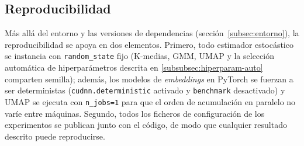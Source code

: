 \subsection{Reproducibilidad}
\label{subsec:reproducibilidad} Más allá del entorno y las versiones de
dependencias (sección~\ref{subsec:entorno}), la reproducibilidad se apoya en
dos elementos. Primero, todo estimador estocástico se instancia con
\texttt{random\_state} fijo (K-medias, GMM, UMAP y la selección automática de
hiperparámetros descrita en \ref{subsubsec:hiperparam-auto} comparten semilla);
además, los modelos de \textit{embeddings} en PyTorch se fuerzan a ser
deterministas (\texttt{cudnn.deterministic} activado y \texttt{benchmark}
desactivado) y UMAP se ejecuta con \texttt{n\_jobs=1} para que el orden de
acumulación en paralelo no varíe entre máquinas. Segundo, todos los ficheros de
configuración de los experimentos se publican junto con el código, de modo que
cualquier resultado descrito puede reproducirse.
